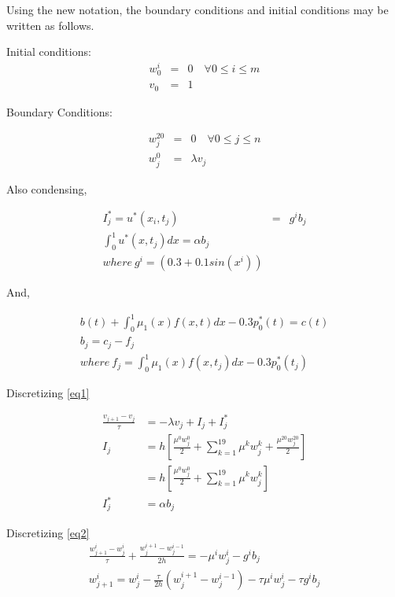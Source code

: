 \documentclass{ifacconf}
\begin{document}
Using the new notation, the boundary conditions and initial conditions may be written as
follows.


Initial conditions:
\begin{eqnarray}
w_0^{i} &=& 0 \quad \forall 0\le i \le m\\
v_0 &=& 1
\end{eqnarray}

Boundary Conditions:

\begin{eqnarray}
w_j^{20} &=& 0 \quad \forall 0\le j\le n\\
w_j^0 &=&  \lambda v_j
\end{eqnarray}

Also condensing,


\begin{eqnarray}
	I_j^{*}=u^{*}(x_i,t_j) &=& g^ib_j \\
\int_0^1 u^{*}(x,t_j)dx = \alpha b_j\\
where\ g^i = (0.3+0.1sin(x^i)) \nonumber
\end{eqnarray}

And,

\begin{eqnarray}
b(t)+\int_0^1\mu_1(x)f(x,t)dx -0.3p_0^{*}(t) = c(t) \nonumber \\
b_j = c_j - f_j \\
where\ f_j = \int_0^1\mu_1(x)f(x,t_j)dx -0.3p_0^{*}(t_j)
\end{eqnarray}



Discretizing \eqref{eq1}

\begin{align} \label{eq:disceq1}
\frac{v_{j+1}-v_j}{\tau} &= -\lambda v_j + I_j + I_j^{*} \\
I_j &= h[\frac{\mu^0 w_j^0}{2} + \sum_{k=1}^{19} \mu^k w_j^k + \frac{\mu^{20} w_j^{20}}{2} ] \\
    &=  h[\frac{\mu^0 w_j^0}{2} + \sum_{k=1}^{19} \mu^k w_j^k ] \nonumber \\
I_j^{*} &= \alpha b_j
\end{align}


Discretizing \eqref{eq2}
\begin{align} \label{eq:disceq2}
\frac{w_{j+1}^i-w_{j}^i}{\tau} + \frac{w_j^{i+1}-w_j^{i-1}}{2h} = -\mu^iw_j^i - g^ib_j \nonumber\\
w_{j+1}^i=w_{j}^i-\frac{\tau}{2h}(w_j^{i+1}-w_j^{i-1})-\tau\mu^i w_j^i - \tau g^i b_j
\end{align}
\end{document}
